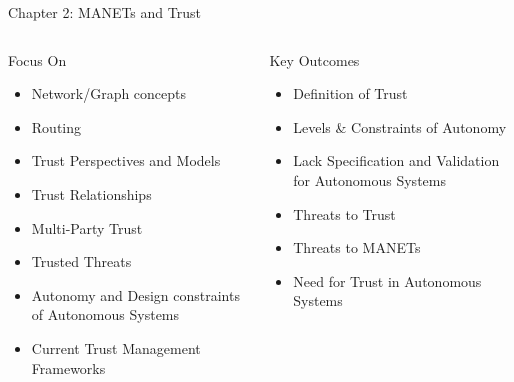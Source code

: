 \documentclass[aspectratio=43]{beamer}
\begin{document}
\begin{frame}{Chapter 2: MANETs and Trust} 
    \begin{columns}
    	\begin{column}{0.5\textwidth}
			\begin{block}{Focus On}
				\begin{itemize}
					\item Network/Graph concepts
					\item Routing
					\item Trust Perspectives and Models
					\item Trust Relationships
					\item Multi-Party Trust
					\item Trusted Threats
					\item Autonomy and Design constraints of Autonomous Systems
					\item Current Trust Management Frameworks
				\end{itemize}
			\end{block}
    	\end{column}
    	\begin{column}{0.5\textwidth}
    		\begin{exampleblock}{Key Outcomes}
    			\begin{itemize}
    				\item Definition of Trust
    				\item Levels \& Constraints of Autonomy
    	            \item Lack Specification and Validation for Autonomous Systems
    				\item Threats to Trust
    				\item Threats to MANETs
    				\item Need for Trust in Autonomous Systems

    			\end{itemize}
    		\end{exampleblock}
    	\end{column}
    \end{columns}
      
\end{frame}
\end{document}
